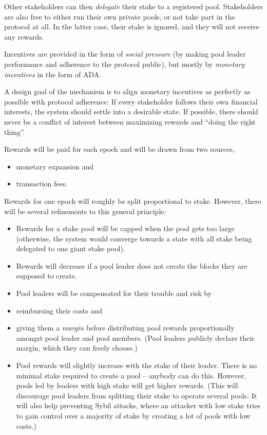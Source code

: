 \documentclass[11pt,a4paper]{article}
\begin{document}
Other stakeholders can then \emph{delegate} their stake to a registered
pool.  Stakeholders are also free to either run their own private
pools, or not take part in the protocol at all. In the latter case,
their stake is ignored, and they will not receive any rewards.

Incentives are provided in the form of \emph{social pressure} (by making
pool leader performance and adherence to the protocol public), but
mostly by \emph{monetary incentives} in the form of ADA.

A design goal of the mechanism is to align monetary incentives as
perfectly as possible with protocol adherence: If every stakeholder
follows their own financial interests, the system should settle into a
desirable state. If possible, there should never be a conflict of
interest between maximizing rewards and ``doing the right thing''.

Rewards will be paid for each epoch and will be drawn from two sources,

\begin{itemize}
\item
  monetary expansion and
\item
  transaction fees.
\end{itemize}

Rewards for one epoch will roughly be split proportional to stake.
However, there will be several refinements to this general principle:

\begin{itemize}
\item
  Rewards for a stake pool will be capped when the pool gets too large
  (otherwise, the system would converge towards a state with all stake
  being delegated to one giant stake pool).
\item
  Rewards will decrease if a pool leader does not create the blocks they
  are supposed to create.
\item
  Pool leaders will be compensated for their trouble and risk by
\item
  reimbursing their costs and
\item
  giving them a \emph{margin} before distributing pool rewards
  proportionally amongst pool leader and pool members. (Pool leaders
  publicly declare their margin, which they can freely choose.)
\item
  Pool rewards will slightly increase with the stake of their leader.
  There is no minimal stake required to create a pool -- anybody can do
  this. However, pools led by leaders with high stake will get higher
  rewards. (This will discourage pool leaders from splitting their stake
  to operate several pools. It will also help preventing Sybil attacks,
  where an attacker with low stake tries to gain control over a majority
  of stake by creating a lot of pools with low costs.)
\end{itemize}
\end{document}

